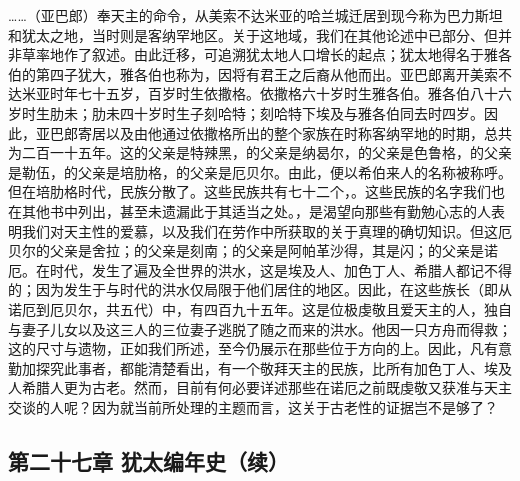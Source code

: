 ……（亚巴郎）奉天主的命令，从美索不达米亚的哈兰城迁居到现今称为巴力斯坦和犹太之地，当时则是客纳罕地区。关于这地域，我们在其他论述中已部分、但并非草率地作了叙述。由此迁移，可追溯犹太地人口增长的起点；犹太地得名于雅各伯的第四子犹大，雅各伯也称为，因将有君王之后裔从他而出。亚巴郎离开美索不达米亚时年七十五岁，百岁时生依撒格。依撒格六十岁时生雅各伯。雅各伯八十六岁时生肋未；肋未四十岁时生子刻哈特；刻哈特下埃及与雅各伯同去时四岁。因此，亚巴郎寄居以及由他通过依撒格所出的整个家族在时称客纳罕地的时期，总共为二百一十五年。这的父亲是特辣黑，的父亲是纳曷尔，的父亲是色鲁格，的父亲是勒伍，的父亲是培肋格，的父亲是厄贝尔。由此，便以希伯来人的名称被称呼。但在培肋格时代，民族分散了。这些民族共有七十二个，。这些民族的名字我们也在其他书中列出，甚至未遗漏此于其适当之处。，是渴望向那些有勤勉心志的人表明我们对天主性的爱慕，以及我们在劳作中所获取的关于真理的确切知识。但这厄贝尔的父亲是舍拉；的父亲是刻南；的父亲是阿帕革沙得，其是闪；的父亲是诺厄。在时代，发生了遍及全世界的洪水，这是埃及人、加色丁人、希腊人都记不得的；因为发生于与时代的洪水仅局限于他们居住的地区。因此，在这些族长（即从诺厄到厄贝尔，共五代）中，有四百九十五年。这是位极虔敬且爱天主的人，独自与妻子儿女以及这三人的三位妻子逃脱了随之而来的洪水。他因一只方舟而得救；这的尺寸与遗物，正如我们所述，至今仍展示在那些位于方向的上。因此，凡有意勤加探究此事者，都能清楚看出，有一个敬拜天主的民族，比所有加色丁人、埃及人希腊人更为古老。然而，目前有何必要详述那些在诺厄之前既虔敬又获准与天主交谈的人呢？因为就当前所处理的主题而言，这关于古老性的证据岂不是够了？\par


\subsection{第二十七章 犹太编年史（续）}

